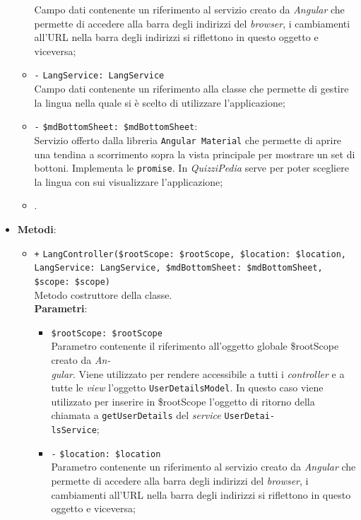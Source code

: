 \begin{itemize}
\begin{itemize}
		Campo dati contenente un riferimento al servizio creato da \textit{Angular} che permette di accedere alla barra degli indirizzi del \textit{browser}, i cambiamenti all'URL nella barra degli indirizzi si riflettono in questo oggetto e viceversa; 
		\item \texttt{-} \texttt{LangService: LangService} \\
		Campo dati contenente un riferimento alla classe che permette di gestire la lingua nella quale si è scelto di utilizzare l'applicazione;
		\item \texttt{-} \texttt{\$mdBottomSheet: \$mdBottomSheet}: \\
		Servizio offerto dalla libreria \texttt{Angular Material} che permette di aprire una tendina a scorrimento sopra la vista principale per mostrare un set di bottoni. Implementa le \texttt{promise}. In \textit{QuizziPedia} serve per poter scegliere la lingua con sui visualizzare l'applicazione;
		\item \scopeA.
	\end{itemize}	
		\item \textbf{Metodi}:
		\begin{itemize}
		\item \texttt{+} \texttt{LangController(\$rootScope: \$rootScope, \$location: \$location, LangService: LangService, \$mdBottomSheet: \$mdBottomSheet, \$scope: \$scope)} \\ Metodo costruttore della classe.\\
		\textbf{Parametri}: 
		\begin{itemize}
			\item \texttt{\$rootScope: \$rootScope} \\
			Parametro contenente il riferimento all'oggetto globale \$rootScope creato da \textit{An-\\gular{}}. Viene utilizzato per rendere accessibile a tutti i \textit{controller} e a tutte le \textit{view} l'oggetto \texttt{UserDetailsModel}. In questo caso viene utilizzato per inserire in \$rootScope l'oggetto di ritorno della chiamata a \texttt{getUserDetails} del \textit{service} \texttt{UserDetai-\\lsService};
			\item \texttt{-} \texttt{\$location: \$location} \\
			Parametro contenente un riferimento al servizio creato da \textit{Angular} che permette di accedere alla barra degli indirizzi del \textit{browser}, i cambiamenti all'URL nella barra degli indirizzi si riflettono in questo oggetto e viceversa; 

\end{itemize}
\end{itemize}
\end{itemize}
